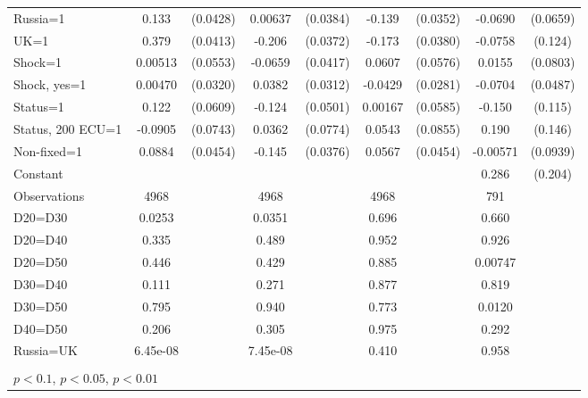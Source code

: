 \begin{tabular}{l|cccccc|cc}
Russia=1        &    0.133\sym{***}& (0.0428)&  0.00637         & (0.0384)&   -0.139\sym{***}& (0.0352)&  -0.0690         & (0.0659)\\
UK=1            &    0.379\sym{***}& (0.0413)&   -0.206\sym{***}& (0.0372)&   -0.173\sym{***}& (0.0380)&  -0.0758         &  (0.124)\\
Shock=1         &  0.00513         & (0.0553)&  -0.0659         & (0.0417)&   0.0607         & (0.0576)&   0.0155         & (0.0803)\\
Shock, yes=1    &  0.00470         & (0.0320)&   0.0382         & (0.0312)&  -0.0429         & (0.0281)&  -0.0704         & (0.0487)\\
Status=1        &    0.122\sym{**} & (0.0609)&   -0.124\sym{**} & (0.0501)&  0.00167         & (0.0585)&   -0.150         &  (0.115)\\
Status, 200 ECU=1&  -0.0905         & (0.0743)&   0.0362         & (0.0774)&   0.0543         & (0.0855)&    0.190         &  (0.146)\\
Non-fixed=1     &   0.0884\sym{*}  & (0.0454)&   -0.145\sym{***}& (0.0376)&   0.0567         & (0.0454)& -0.00571         & (0.0939)\\
Constant        &                  &         &                  &         &                  &         &    0.286         &  (0.204)\\
\hline
Observations    &     4968         &         &     4968         &         &     4968         &         &      791         &         \\
D20=D30         &   0.0253         &         &   0.0351         &         &    0.696         &         &    0.660         &         \\
D20=D40         &    0.335         &         &    0.489         &         &    0.952         &         &    0.926         &         \\
D20=D50         &    0.446         &         &    0.429         &         &    0.885         &         &  0.00747         &         \\
D30=D40         &    0.111         &         &    0.271         &         &    0.877         &         &    0.819         &         \\
D30=D50         &    0.795         &         &    0.940         &         &    0.773         &         &   0.0120         &         \\
D40=D50         &    0.206         &         &    0.305         &         &    0.975         &         &    0.292         &         \\
Russia=UK       & 6.45e-08         &         & 7.45e-08         &         &    0.410         &         &    0.958         &         \\
\hline\hline
\multicolumn{9}{p{16cm}}{\tiny }\\
\multicolumn{9}{l}{\tiny \sym{*} \(p<0.1\), \sym{**} \(p<0.05\), \sym{***} \(p<0.01\)}\\
\end{tabular}